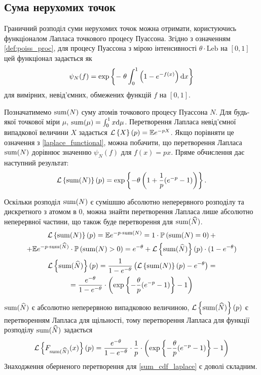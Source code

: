 \subsection{Сума нерухомих точок}
Граничний розподіл суми нерухомих точок можна отримати, користуючись функціоналом Лапласа точкового процесу Пуассона.
Згідно з означенням \ref{def:poiss_proc}, для процесу Пуассона з мірою інтенсивності 
$\theta \cdot \mathrm{Leb}$ на $[0, 1]$ цей функціонал задається як
\begin{equation}\label{laplace_functional}
    \psi_N(f) = \exp\left\{ - \; \theta \int_0^1 \left(1 - e^{-f(x)}\right) \mathrm{d} x\right\}
\end{equation}
для вимірних, невід'ємних, обмежених функцій $f$ на $[0, 1]$.

Позначатимемо $\operatorname{sum}(N)$ суму атомів точкового процесу Пуассона $N$. 
Для будь-якої точкової міри $\mu$, 
$\operatorname{sum}(\mu) = \int_0^1 x \mathrm{d}\mu$. 
Перетворення Лапласа невід'ємної випадкової величини $X$ задається
$\mathcal{L}\left\{X\right\}(p) = \mathbb{E} e^{-pX}$. 
Якщо порівняти це означення з \eqref{laplace_functional}, можна побачити, що
перетворення Лапласа $\operatorname{sum}(N)$ дорівнює значенню $\psi_N(f)$ для $f(x) = px$.
Пряме обчислення дає наступний результат:
\begin{gather}\label{laplace_of_sum}
    \mathcal{L}\left\{\operatorname{sum}(N)\right\}(p) = 
    \exp\left\{- \theta \left( 1 + \frac{1}{p}(e^{-p} - 1)\right) \right\}.
\end{gather}

Оскільки розподіл $\operatorname{sum}(N)$ є сумішшю абсолютно неперервного розподілу та
дискретного з атомом в 0, можна знайти перетворення Лапласа
лише абсолютно неперервної частини, що також буде перетворення для
$\operatorname{sum}(\widehat{N})$.
\begin{gather*}
    \mathcal{L}\left\{\operatorname{sum}(N)\right\}(p) = \mathbb{E} e^{-p\cdot\operatorname{sum}(N)} = 
    1 \cdot \mathbb{P}\left(\operatorname{sum}(N) = 0\right) + \\ +
    \mathbb{E} e^{-p\cdot\operatorname{sum}(\widehat{N})} \cdot \mathbb{P}\left(\operatorname{sum}(N) > 0\right) =
    e^{-\theta} + \mathcal{L}\left\{\operatorname{sum}(\widehat{N})\right\}(p) \cdot (1-e^{-\theta})
    \\
    \mathcal{L}\left\{\operatorname{sum}(\widehat{N})\right\}(p) = \frac{1}{1 - e^{-\theta}}
    \left(\mathcal{L}\left\{\operatorname{sum}(N)\right\}(p) - e^{-\theta}\right) = \\ =
    \frac{e^{-\theta}}{1 - e^{-\theta}} \cdot 
    \left(\exp\left\{- \frac{\theta}{p}(e^{-p} - 1) \right\} - 1\right)
\end{gather*}

$\operatorname{sum}(\widehat{N})$ є абсолютно неперервною випадковою величиною,
$\mathcal{L}\left\{\operatorname{sum}(\widehat{N})\right\}(p)$ є перетворенням Лапласа для щільності, тому
перетворення Лапласа для функції розподілу $\operatorname{sum}(\widehat{N})$
задається 
\begin{equation}\label{sum_cdf_laplace}
    \mathcal{L}\left\{F_{\operatorname{sum}(\widehat{N})}(x)\right\}(p) = 
    \frac{e^{-\theta}}{1 - e^{-\theta}} \cdot \frac{1}{p} \cdot
    \left(\exp\left\{- \frac{\theta}{p}(e^{-p} - 1) \right\} - 1\right)
\end{equation}
Знаходження оберненого перетворення для \eqref{sum_cdf_laplace}
є доволі складним.

